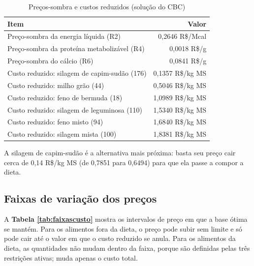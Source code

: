 \documentclass[a4paper,12pt]{article}
\begin{document}
\begin{table}[htbp]
    \centering
    \caption{Preços-sombra e custos reduzidos (solução do CBC)}
    \label{tab:duais}
    \begin{tabular}{lr}
        \toprule
        \textbf{Item} & \textbf{Valor} \\
        \midrule
        \rowcolor{gray!15}
        Preço-sombra da energia líquida (R2) & 0,2646 R\$/Mcal \\
        Preço-sombra da proteína metabolizável (R4) & 0,0018 R\$/g \\
        \rowcolor{gray!15}
        Preço-sombra do cálcio (R6) & 0,0841 R\$/g \\
        \midrule
        Custo reduzido: silagem de capim-sudão (176) & 0,1357 R\$/kg MS \\
        \rowcolor{gray!15}
        Custo reduzido: milho grão (44) & 0,5046 R\$/kg MS \\
        Custo reduzido: feno de bermuda (18) & 1,0989 R\$/kg MS \\
        \rowcolor{gray!15}
        Custo reduzido: silagem de leguminosa (110) & 1,5340 R\$/kg MS \\
        Custo reduzido: feno misto (94) & 1,6840 R\$/kg MS \\
        \rowcolor{gray!15}
        Custo reduzido: silagem mista (100) & 1,8381 R\$/kg MS \\
        \bottomrule
    \end{tabular}
\end{table}

A silagem de capim-sudão é a alternativa mais próxima: basta seu preço cair cerca de 0,14 R\$/kg MS (de 0,7851 para 0,6494) para que ela passe a compor a dieta.

\subsection{Faixas de variação dos preços}

A \textbf{Tabela \ref{tab:faixascusto}} mostra os intervalos de preço em que a base ótima se mantém. Para os alimentos fora da dieta, o preço pode subir sem limite e só pode cair até o valor em que o custo reduzido se anula. Para os alimentos da dieta, as quantidades não mudam dentro da faixa, porque são definidas pelas três restrições ativas; muda apenas o custo total.
\end{document}
